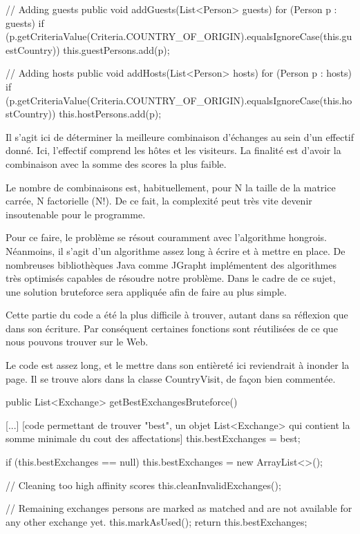 \documentclass{mytex}
\begin{document}
\begin{codebox}
// Adding guests
public void addGuests(List<Person> guests) {
	for (Person p : guests) {
		if (p.getCriteriaValue(Criteria.COUNTRY_OF_ORIGIN).equalsIgnoreCase(this.guestCountry)) {
			this.guestPersons.add(p);
		}
	}
}

// Adding hosts
public void addHosts(List<Person> hosts) {
	for (Person p : hosts) {
		if (p.getCriteriaValue(Criteria.COUNTRY_OF_ORIGIN).equalsIgnoreCase(this.hostCountry)) {
			this.hostPersons.add(p);
		}
	}
}
\end{codebox}


Il s'agit ici de déterminer la meilleure combinaison d'échanges au sein d'un effectif donné. Ici, l'effectif comprend les hôtes et les visiteurs. La finalité est d'avoir la combinaison avec la somme des scores la plus faible.

Le nombre de combinaisons est, habituellement, pour N la taille de la matrice carrée, N factorielle (N!). De ce fait, la complexité peut très vite devenir insoutenable pour le programme.

Pour ce faire, le problème se résout couramment avec l'algorithme hongrois. Néanmoins, il s'agit d'un algorithme assez long à écrire et à mettre en place. De nombreuses bibliothèques Java comme JGrapht implémentent des algorithmes très optimisés capables de résoudre notre problème. Dans le cadre de ce sujet, une solution bruteforce sera appliquée afin de faire au plus simple.

Cette partie du code a été la plus difficile à trouver, autant dans sa réflexion que dans son écriture. Par conséquent certaines fonctions sont réutilisées de ce que nous pouvons trouver sur le Web.

Le code est assez long, et le mettre dans son entièreté ici reviendrait à inonder la page. Il se trouve alors dans la classe CountryVisit, de façon bien commentée.

\begin{codebox}
public List<Exchange> getBestExchangesBruteforce() {
    [...]
	[code permettant de trouver "best", un objet List<Exchange> qui contient la somme minimale du cout des affectations]
%	
    this.bestExchanges = best;

	if (this.bestExchanges == null) {
		this.bestExchanges = new ArrayList<>();
	}
	
	// Cleaning too high affinity scores
	this.cleanInvalidExchanges();
	
	// Remaining exchanges persons are marked as matched and are not available for any other exchange yet.
	this.markAsUsed();
	return this.bestExchanges;
}
\end{codebox}
\end{document}
